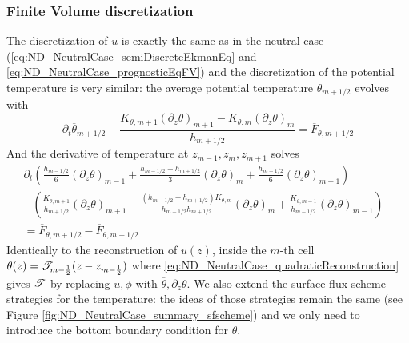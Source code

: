 \subsubsection{Finite Volume discretization}
\label{sec:ND_StratifiedCase_FVDis}
The discretization of $u$ is exactly the same as in the
neutral case (\eqref{eq:ND_NeutralCase_semiDiscreteEkmanEq} and \eqref{eq:ND_NeutralCase_prognosticEqFV}) and the discretization of 
the potential temperature is very similar:
the average potential temperature $\overline{\theta}_{m+1/2}$
evolves with
\begin{equation}
\label{eq:ND_StratifiedCase_semiDiscreteEkmanEqPT}
    \partial_t \overline{\theta}_{m+1/2}
    - \frac{K_{\theta, m+1} {(\partial_z \theta)}_{m+1} - K_{\theta, m} {(\partial_z \theta)}_m}{h_{m+1/2}}
	= \overline{F}_{\theta, m+1/2}
\end{equation}
And the derivative of temperature at $z_{m-1}, z_m, z_{m+1}$ solves
\begin{equation}
\begin{aligned}
\label{eq:ND_StratifiedCase_prognosticPT_FV}
\partial_t \left( \frac{h_{m-1/2}}{6} {(\partial_z \theta)}_{m-1}
+ \frac{h_{m-1/2} + h_{m+1/2}}{3} {(\partial_z \theta)}_m
	+ \frac{h_{m+1/2}}{6} {(\partial_z \theta)}_{m+1} \right)
	~~~~~~~~~~& \\
	-
    \left(
	\frac{K_{\theta, m+1}}{ h_{m+1/2}}{(\partial_z \theta)}_{m+1}
	- \frac{(h_{m-1/2} + h_{m+1/2}) K_{\theta, m}}{h_{m-1/2} h _{m+1/2}}
	{(\partial_z \theta)}_m + \frac{K_{\theta, m-1}}{ h_{m-1/2}}{(\partial_z \theta)}_{m-1}
	\right)&\\
	= \overline{F}_{\theta, m+1/2} - \overline{F}_{\theta, m-1/2}&
\end{aligned}
\end{equation}
Identically to the reconstruction of $u(z)$,
inside the $m$-th cell
$\theta(z) = {\cal T}_{m-\frac{1}{2}}(z-z_{m-\frac{1}{2}})$
where \eqref{eq:ND_NeutralCase_quadraticReconstruction}
gives ${\cal T}$ by replacing $\overline{u}, \phi$
with $\overline{\theta}, \partial_z \theta$.
We also extend the surface flux scheme strategies for the temperature:
the ideas of those strategies remain the same
(see Figure \ref{fig:ND_NeutralCase_summary_sfscheme}) and we only
need to introduce the bottom boundary condition for $\theta$.
